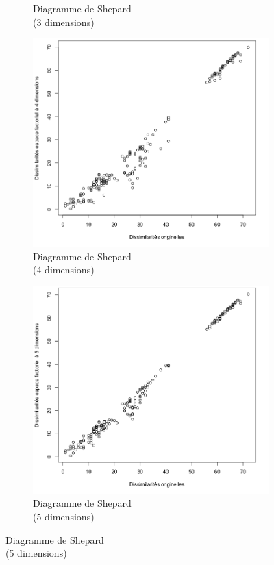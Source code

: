 \documentclass[a4paper,10pt]{report}
\begin{document}
\begin{figure}[H]
\begin{subfigure}[b]{0.25\linewidth}
		\caption{\scriptsize Diagramme de Shepard\\(3 dimensions)}
		\label{fig:1-mut-acp-aftd-diag-shepard-3-dim}
	\end{subfigure}%
		\begin{subfigure}[b]{0.25\linewidth}
		\centering
		\captionsetup{justification=centering}
		\includegraphics[width=1\linewidth]{img/1-mut-acp-aftd-diag-shepard-4-dim}
		\caption{\scriptsize Diagramme de Shepard\\(4 dimensions)}
		\label{fig:1-mut-acp-aftd-diag-shepard-4-dim}
	\end{subfigure}%
	\begin{subfigure}[b]{0.25\linewidth}
		\centering
		\captionsetup{justification=centering}
		\includegraphics[width=1\linewidth]{img/1-mut-acp-aftd-diag-shepard-5-dim}
		\caption{\scriptsize Diagramme de Shepard\\(5 dimensions)}
		\label{fig:1-mut-acp-aftd-diag-shepard-5-dim}
	\end{subfigure}%
	\label{fig:1-mut-acp-aftd-diag-shepard}%
\end{figure}
\end{document}
